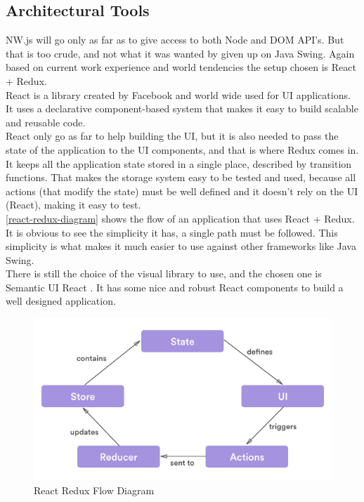 \subsection{Architectural Tools}
NW.js will go only as far as to give access to both Node and DOM API's. But that
is too crude, and not what it was wanted by given up on Java Swing. Again based on
current work experience and world tendencies the setup chosen is React + Redux. \\
React \cite{React} is a library created by Facebook and world wide used for UI applications.
It uses a declarative component-based system that makes it easy to build scalable
and reusable code.\\
React only go as far to help building the UI, but it is also needed to pass the state
of the application to the UI components, and that is where Redux \cite{Redux} comes in.
It keeps all the application state stored in a single place, described by transition
functions. That makes the storage system easy to be tested and used, because all
actions (that modify the state) must be well defined and it doesn't rely on the
UI (React), making it easy to test.\\
\autoref{react-redux-diagram} shows the flow of an application that uses
React + Redux. It is obvious to see the simplicity it has, a single path must be followed.
This simplicity is what makes it much easier to use against other frameworks like
Java Swing. \\
There is still the choice of the visual library to use, and the chosen one is
Semantic UI React \cite{semantic-ui}. It has some nice and robust React components
to build a well designed application.

\begin{figure}[htb]
  \centering
  \caption{React Redux Flow Diagram}
  \label{react-redux-diagram}
  \includegraphics[scale=0.5]{images/react-redux-diagram}
\end{figure}

